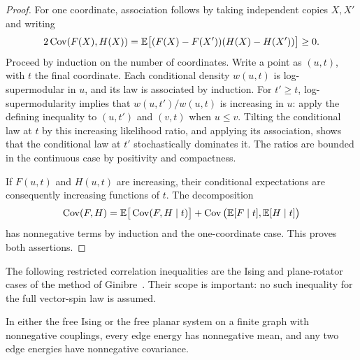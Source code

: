 \begin{proof}
For one coordinate, association follows by taking independent copies
$X,X'$ and writing
\[
 2\operatorname{Cov}(F(X),H(X))
 =\mathbb E\big[(F(X)-F(X'))(H(X)-H(X'))\big]\geq0.
\]
Proceed by induction on the number of coordinates.  Write a point as
$(u,t)$, with $t$ the final coordinate.  Each conditional density
$w(u,t)$ is log-supermodular in $u$, and its law is associated by
induction.  For $t'\geq t$, log-supermodularity implies that
$w(u,t')/w(u,t)$ is increasing in $u$: apply the defining inequality to
$(u,t')$ and $(v,t)$ when $u\leq v$.  Tilting the conditional law at $t$
by this increasing likelihood ratio, and applying its association,
shows that the conditional law at $t'$ stochastically dominates it.
The ratios are bounded in the continuous case by positivity and
compactness.

If $F(u,t)$ and $H(u,t)$ are increasing, their conditional expectations
are consequently increasing functions of $t$.  The decomposition
\[
 \operatorname{Cov}(F,H)
 =\mathbb E\big[\operatorname{Cov}(F,H\mid t)\big]
  +\operatorname{Cov}\big(\mathbb E[F\mid t],\mathbb E[H\mid t]\big)
\]
has nonnegative terms by induction and the one-coordinate case.
This proves both assertions.
\end{proof}

The following restricted correlation inequalities are the Ising and
plane-rotator cases of the method of Ginibre~\cite{Ginibre}. Their
scope is important: no such inequality for the full vector-spin law
is assumed.

\begin{lemma}\label{lem:edge-correlation-inequalities}
In either the free Ising or the free planar system on a finite graph
with nonnegative couplings, every edge energy has nonnegative mean,
and any two edge energies have nonnegative covariance.
\end{lemma}

